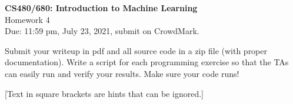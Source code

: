 \documentclass[10pt,letter,notitlepage]{article}
\newcounter{exercise}
\begin{document}
\begin{center}
\large{\textbf{CS480/680: Introduction to Machine Learning} \\ Homework 4\\ Due: 11:59 pm, July 23, 2021, submit on CrowdMark.} \\


\end{center}

\begin{center}
Submit your writeup in pdf and all source code in a zip file (with proper documentation). Write a script for each programming exercise so that the TAs can easily run and verify your results. Make sure your code runs!

[Text in square brackets are hints that can be ignored.]
\end{center}
\end{document}
